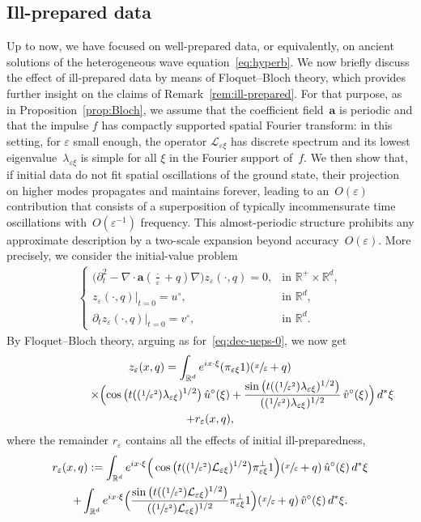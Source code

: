 \documentclass[JEP,XML,SOM,Unicode,published]{cedram}
\newcommand{\Psfrac}[2]{(\sfrac{#1}{#2})}
\theoremstyle{plain}
\theoremstyle{definition}
\numberwithin{equation}{section}
\newcommand{\e}{\varepsilon}
\newcommand{\Lc}{\mathcal{L}}
\newcommand{\R}{\mathbb R}
\newcommand{\Aa}{\boldsymbol a}
\begin{document}
\subsection{Ill-prepared data}\label{sec:ill-posed}
Up to now, we have focused on well-prepared data, or equivalently, on ancient solutions of the heterogeneous wave equation~\eqref{eq:hyperb}.
We now briefly discuss the effect of ill-prepared data by means of Floquet--Bloch theory, which provides further insight on the claims of Remark~\ref{rem:ill-prepared}.
For that purpose, as in Proposition~\ref{prop:Bloch}, we assume that the coefficient field~$\Aa$ is periodic and that the impulse $f$ has compactly supported spatial Fourier transform: in this setting, for $\e$ small enough, the operator $\Lc_{\e\xi}$ has discrete spectrum and its lowest eigenvalue~$\lambda_{\e\xi}$ is simple for all $\xi$ in the Fourier support of~$f$.
We then show that, if initial data do not fit spatial oscillations of the ground state,
their projection on higher modes propagates and maintains forever, leading to an~$O(\e)$ contribution that consists of a superposition of typically incommensurate time oscillations with~$O(\e^{-1})$ frequency. This almost-periodic structure prohibits any approximate description by a two-scale expansion beyond accuracy~$O(\e)$.
More precisely, we consider the initial-value problem
\begin{gather*}
\begin{cases}
\big(\partial_t^2-\nabla\cdot\Aa(\tfrac\cdot\e+q)\nabla\big)z_\e(\cdot,q)=0,&\text{in $\R^+\times\R^d$},\\
z_\e(\cdot,q)|_{t=0}=u^\circ,&\text{in $\R^d$},\\
\partial_tz_\e(\cdot,q)|_{t=0}=v^\circ,&\text{in $\R^d$}.
\end{cases}
\end{gather*}
By Floquet--Bloch theory, arguing as for~\eqref{eq:dec-ueps-0}, we now get
\begin{multline*}
z_\e(x,q)
=\int_{\R^d}e^{ix\cdot\xi}(\pi_{\e\xi}1)(\sfrac x\e+q)\\[-5pt]\hspace*{2cm}\times\Bigl(\cos\big(t(\Psfrac1{\e^2}\lambda_{\e\xi})^{1/2}\big)\,\hat u^\circ(\xi)+\frac{\sin\big(t(\Psfrac1{\e^2}\lambda_{\e\xi})^{1/2}\big)}{(\Psfrac1{\e^2}\lambda_{\e\xi})^{1/2}}\,\hat v^\circ(\xi)\Bigr)\,d^*\xi\\
+r_\e(x,q),
\end{multline*}
where the remainder $r_{\e}$ contains all the effects of initial ill-preparedness,
\begin{multline*}
r_\e(x,q):=\int_{\R^d}e^{ix\cdot\xi}\Big(\cos\big(t(\Psfrac1{\e^2}\Lc_{\e\xi})^{1/2}\big)\pi_{\e\xi}^\bot1\Big)(\sfrac x\e+q)\,\hat u^\circ(\xi)\,d^*\xi\\
+\int_{\R^d}e^{ix\cdot\xi}\Bigl(\frac{\sin\big(t(\Psfrac1{\e^2}\Lc_{\e\xi})^{1/2}\big)}{(\Psfrac1{\e^2}\Lc_{\e\xi})^{1/2}}\pi_{\e\xi}^\bot1\Bigr)(\sfrac x\e+q)\,\hat v^\circ(\xi)\,d^*\xi.
\end{multline*}
\end{document}
